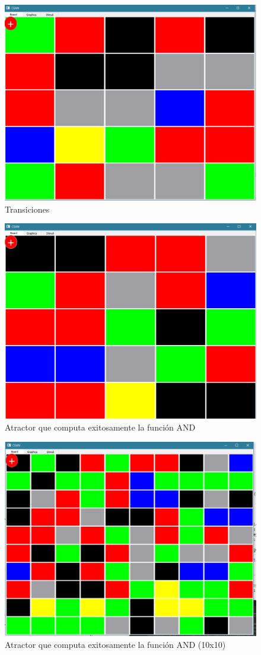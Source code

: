 \documentclass[]{article}
\begin{document}
\begin{figure}
\centering
\includegraphics[width=0.7\linewidth]{or_estado_2}
\caption{Transiciones}
\label{fig:or_estado_2}
\end{figure}

\begin{figure}
\centering
\includegraphics[width=0.7\linewidth]{or}
\caption{Atractor que computa exitosamente la función AND}
\label{fig:or_estado_2}
\end{figure}

\begin{figure}
\centering
\includegraphics[width=0.7\linewidth]{or_1010}
\caption{Atractor que computa exitosamente la función AND (10x10)}
\label{fig:or_1010}
\end{figure}
\end{document}
